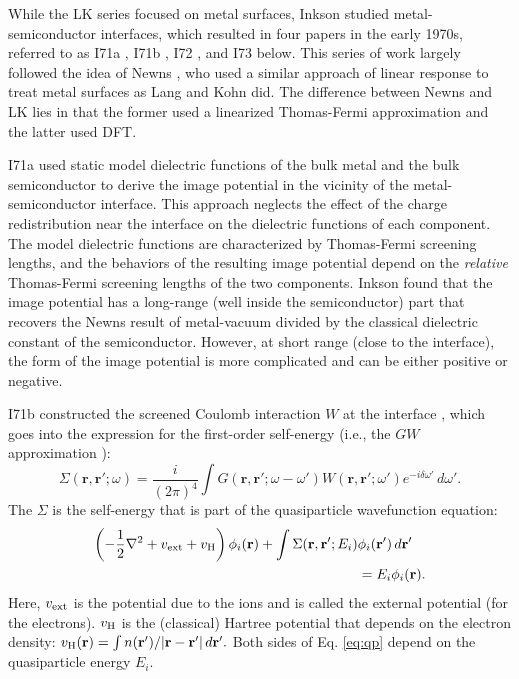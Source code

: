 \documentclass[aip, amsmath, amssymb, reprint, longbibliography]{revtex4-2}
\def\mr{\mathbf{r}}
\begin{document}
While the LK series focused on metal surfaces, Inkson studied metal-semiconductor interfaces, which resulted in four papers in the early 1970s, referred to as I71a \cite{I71a}, I71b \cite{I71b}, I72 \cite{I72}, and I73 \cite{I73} below. This series of work largely followed the idea of Newns \cite{N69}, who used a similar approach of linear response to treat metal surfaces as Lang and Kohn did. The difference between Newns and LK lies in that the former used a linearized Thomas-Fermi approximation and the latter used DFT. 

I71a used static model dielectric functions \cite{I71a} of the bulk metal and the bulk semiconductor to derive the image potential in the vicinity of the metal-semiconductor interface. This approach neglects the effect of the charge redistribution near the interface on the dielectric functions of each component. The model dielectric functions are characterized by Thomas-Fermi screening lengths, and the behaviors of the resulting image potential depend on the \emph{relative} Thomas-Fermi screening lengths of the two components. Inkson found that the image potential has a long-range (well inside the semiconductor) part that recovers the Newns result \cite{N69} of metal-vacuum divided by the classical dielectric constant of the semiconductor. However, at short range (close to the interface), the form of the image potential is more complicated and can be either positive or negative. 

I71b constructed the screened Coulomb interaction $W$ at the interface \cite{I71b}, which goes into the expression for the first-order self-energy (i.e., the $GW$ approximation \cite{H65}):
\begin{equation}
\Sigma(\mr,\mr';\omega) = \frac{i}{(2\pi)^4}\int G(\mr,\mr';\omega-\omega')W(\mr,\mr';\omega')e^{-i\delta \omega'}\,d\omega'.
\label{eq:gw}
\end{equation}
The $\Sigma$ is the self-energy that is part of the quasiparticle wavefunction equation:
\begin{equation}
\begin{split}
\left(-\frac{1}{2}\nabla^2+v_{\rm ext}+v_{\rm H}\right)\phi_i(\mr)+\int \Sigma(\mr,\mr';E_i) & \phi_i(\mr')\,d\mr' \\
& =E_i\phi_i(\mr).
\end{split}
\label{eq:qp}
\end{equation}
Here, $v_{\rm ext}$ is the potential due to the ions and is called the external potential (for the electrons). $v_{\rm H}$ is the (classical) Hartree potential that depends on the electron density: $v_{\rm H}(\mr)=\int n(\mr')/|\mr-\mr'|\,d\mr'.$ Both sides of Eq. \eqref{eq:qp} depend on the quasiparticle energy $E_i$.
\end{document}
